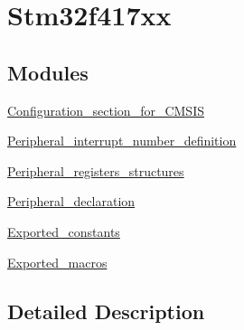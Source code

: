 \hypertarget{group__stm32f417xx}{}\section{Stm32f417xx}
\label{group__stm32f417xx}
\subsection*{Modules}
\begin{DoxyCompactItemize}
\item 
\hyperlink{group___configuration__section__for___c_m_s_i_s}{Configuration\+\_\+section\+\_\+for\+\_\+\+C\+M\+S\+IS}
\item 
\hyperlink{group___peripheral__interrupt__number__definition}{Peripheral\+\_\+interrupt\+\_\+number\+\_\+definition}
\item 
\hyperlink{group___peripheral__registers__structures}{Peripheral\+\_\+registers\+\_\+structures}
\item 
\hyperlink{group___peripheral__declaration}{Peripheral\+\_\+declaration}
\item 
\hyperlink{group___exported__constants}{Exported\+\_\+constants}
\item 
\hyperlink{group___exported__macros}{Exported\+\_\+macros}
\end{DoxyCompactItemize}


\subsection{Detailed Description}
